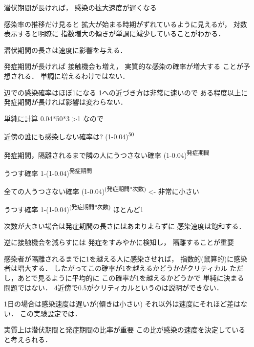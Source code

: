 \documentclass[10pt,oneside]{scrartcl}
\begin{document}
潜伏期間が長ければ，
感染の拡大速度が遅くなる

感染率の推移だけ見ると
拡大が始まる時期がずれているように見えるが，
対数表示すると明瞭に
指数増大の傾きが単調に減少していることがわかる．

潜伏期間の長さは速度に影響を与える．

\begin{figure*}%
  \centering
\end{figure*}

発症期間が長ければ
接触機会も増え，
実質的な感染の確率が増大する
ことが予想される．
単調に増えるわけではない．

辺での感染確率はほぼ1になる
1への近づき方は非常に速いので
ある程度以上に発症期間が長ければ影響は変わらない．

単純に計算
0.04*50*3 >1  なので

近傍の誰にも感染しない確率は?
(1-0.04)\textsuperscript{50}

発症期間，隔離されるまで隣の人にうつさない確率
(1-0.04)\textsuperscript{発症期間} 

うつす確率
1-(1-0.04)\textsuperscript{発症期間}

全ての人うつさない確率
(1-0.04)\textsuperscript{(発症期間*次数)} <- 非常に小さい

うつす確率
1-(1-0.04)\textsuperscript{(発症期間*次数)} ほとんど1

次数が大きい場合は発症期間の長さにはあまりよらずに
感染速度は飽和する．

逆に接触機会を減らすには
発症をすみやかに検知し，
隔離することが重要

感染者が隔離されるまでに1を越える人に感染させれば，
指数的(鼠算的)に感染者は増大する．
したがってこの確率が1を越えるかどうかがクリティカル
ただし，あとで見るように平均的に
この確率が1を越えるかどうかで
単純に決まる問題ではない．
4近傍で0.5がクリティカルというのは説明ができない．

1日の場合は感染速度は遅いが(傾きは小さい)
それ以外は速度にそれほど差はない．
この実験設定では．

\begin{figure*}%
  \centering
\end{figure*}

実質上は潜伏期間と発症期間の比率が重要
この比が感染の速度を決定していると考えられる．
\end{document}
